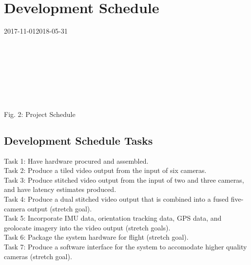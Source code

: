\documentclass[letterpaper,10pt,serif,draftclsnofoot,onecolumn,compsoc,titlepage]{IEEEtran}
\begin{document}
\section{Development Schedule}
	\begin{ganttchart}
    	[hgrid, x unit=0.77mm, y unit chart=9.0mm, title label font=\normalsize, time slot format=isodate]
    	{2017-11-01}{2018-05-31}
    	\\
    	\\
    	\\
    	\\
    	\\
    	\\
    	\\
    	\\
	\end{ganttchart}
\begin{center}
	Fig. 2: Project Schedule
\end{center}	

\subsection{Development Schedule Tasks}
Task 1: Have hardware procured and assembled.\\
Task 2: Produce a tiled video output from the input of six cameras.\\
Task 3: Produce stitched video output from the input of two and three cameras, 
and have latency estimates produced.\\
Task 4: Produce a dual stitched video output that is combined into a fused 
five-camera output (stretch goal).\\
Task 5: Incorporate IMU data, orientation tracking data, GPS data, and 
geolocate imagery into the video output (stretch goals).\\
Task 6: Package the system hardware for flight (stretch goal).\\
Task 7: Produce a software interface for the system to accomodate higher 
quality cameras (stretch goal).\\
\end{document}
